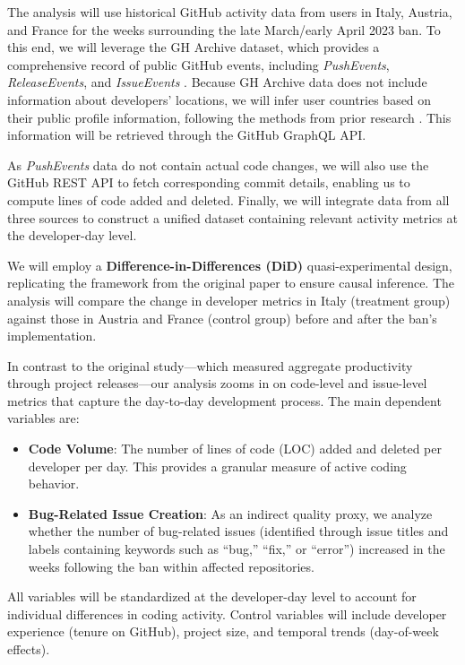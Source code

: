 The analysis will use historical GitHub activity data from users in Italy, Austria, and France for the weeks surrounding the late March/early April 2023 ban. To this end, we will leverage the GH Archive dataset, which provides a comprehensive record of public GitHub events, including \textit{PushEvents}, \textit{ReleaseEvents}, and \textit{IssueEvents} \cite{github_archive}. Because GH Archive data does not include information about developers’ locations, we will infer user countries based on their public profile information, following the methods from prior research \cite{Kreitmeir2023}. This information will be retrieved through the GitHub GraphQL API.

As \textit{PushEvents} data do not contain actual code changes, we will also use the GitHub REST API to fetch corresponding commit details, enabling us to compute lines of code added and deleted. Finally, we will integrate data from all three sources to construct a unified dataset containing relevant activity metrics at the developer-day level.


We will employ a \textbf{Difference-in-Differences (DiD)} quasi-experimental design, replicating the framework from the original paper to ensure causal inference. The analysis will compare the change in developer metrics in Italy (treatment group) against those in Austria and France (control group) before and after the ban's implementation.

In contrast to the original study—which measured aggregate productivity through project releases—our analysis zooms in on code-level and issue-level metrics that capture the day-to-day development process. The main dependent variables are:

\begin{itemize}
  \item \textbf{Code Volume}: The number of lines of code (LOC) added and deleted per developer per day. This provides a granular measure of active coding behavior.
  \item \textbf{Bug-Related Issue Creation}: As an indirect quality proxy, we analyze whether the number of bug-related issues (identified through issue titles and labels containing keywords such as “bug,” “fix,” or “error”) increased in the weeks following the ban within affected repositories.
\end{itemize}

All variables will be standardized at the developer-day level to account for individual differences in coding activity. Control variables will include developer experience (tenure on GitHub), project size, and temporal trends (day-of-week effects).



